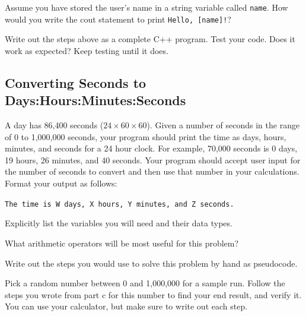 \begin{multipart}
    Assume you have stored the user's name in a string variable called \texttt{name}. How would you write the cout statement to print \texttt{Hello, [name]!}?
\end{multipart}

\vspace{3cm}

\begin{multipart}
    Write out the steps above as a complete C++ program. Test your code. Does it work as expected? Keep testing until it does. 
\end{multipart}

\subsection{Converting Seconds to Days:Hours:Minutes:Seconds}
A day has 86,400 seconds ($24 \times 60 \times 60$). Given a number of seconds in the range of 0 to 1,000,000 seconds, your program should print the time as days, hours, minutes, and seconds for a 24 hour clock. For example, 70,000 seconds is 0 days, 19 hours, 26 minutes, and 40 seconds. Your program should accept user input for the number of seconds to convert and then use that number in your calculations. Format your output as follows: 

\texttt{The time is W days, X hours, Y minutes, and Z seconds.}

\begin{multipart}
    Explicitly list the variables you will need and their data types. 
\end{multipart}

\vspace{3cm}

\begin{multipart}
    What arithmetic operators will be most useful for this problem?
\end{multipart}

\vspace{2cm}

\begin{multipart}
    Write out the steps you would use to solve this problem by hand as pseudocode. 
\end{multipart}

\vspace{5cm}

\begin{multipart}
    Pick a random number between 0 and 1,000,000 for a sample run. Follow the steps you wrote from part c for this number to find your end result, and verify it. You can use your calculator, but make sure to write out each step.
\end{multipart}


